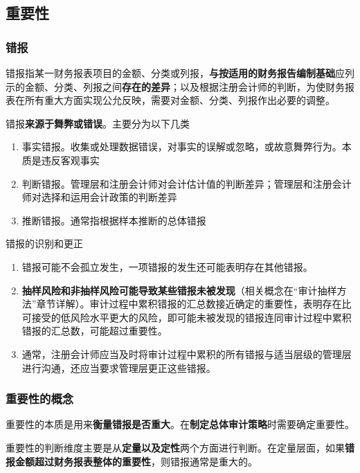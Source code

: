 \documentclass[UTF8,12pt]{ctexart}
\numberwithin{equation}{section} %
\numberwithin{figure}{section}
\numberwithin{table}{section}
\begin{document}
	
	\subsection{重要性}
	\subsubsection{错报}
	
	错报指某一财务报表项目的金额、分类或列报，\textbf{与按适用的财务报告编制基础}应列示的金额、分类、列报之间\textbf{存在的差异}；以及根据注册会计师的判断，为使财务报表在所有重大方面实现公允反映，需要对金额、分类、列报作出必要的调整。
	
	错报\textbf{来源于舞弊或错误}。主要分为以下几类
	\begin{enumerate}
		\item 事实错报。收集或处理数据错误，对事实的误解或忽略，或故意舞弊行为。本质是违反客观事实
		
		\item 判断错报。管理层和注册会计师对会计估计值的判断差异；管理层和注册会计师对选择和运用会计政策的判断差异
		
		\item 推断错报。通常指根据样本推断的总体错报
	\end{enumerate}
	
	错报的识别和更正
	\begin{enumerate}
		\item 错报可能不会孤立发生，一项错报的发生还可能表明存在其他错报。
		
		\item \textbf{抽样风险和非抽样风险可能导致某些错报未被发现}（相关概念在“审计抽样方法”章节详解）。审计过程中累积错报的汇总数接近确定的重要性，表明存在比可接受的低风险水平更大的风险，即可能未被发现的错报连同审计过程中累积错报的汇总数，可能超过重要性。
		
		\item 通常，注册会计师应当及时将审计过程中累积的所有错报与适当层级的管理层进行沟通，还应当要求管理层更正这些错报。
	\end{enumerate}
	
	\subsubsection{重要性的概念}
	重要性的本质是用来\textbf{衡量错报是否重大}。在\textbf{制定总体审计策略}时需要确定重要性。
	
	重要性的判断维度主要是从\textbf{定量以及定性}两个方面进行判断。在定量层面，如果\textbf{错报金额超过财务报表整体的重要性}，则错报通常是重大的。
	
\end{document}
